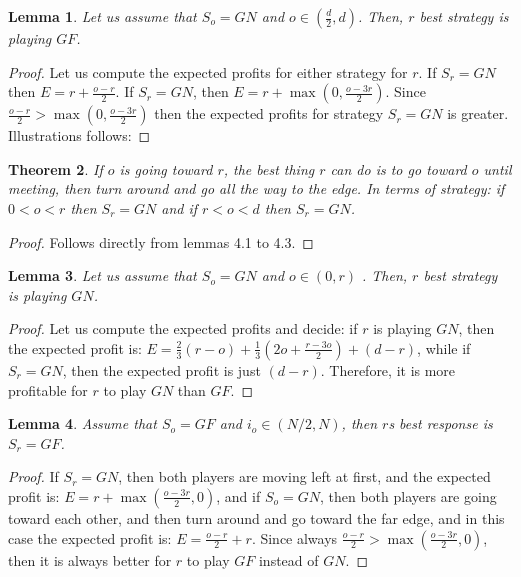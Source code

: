 \documentclass[a4paper,10pt]{article}
\newtheorem{theorem}{Theorem}[section]
\newtheorem{lemma}[theorem]{Lemma}
\newcommand\rob{\ensuremath{r}\xspace}
\newcommand\opp{\ensuremath{o}\xspace}
\newcommand{\gn}{\ensuremath{GN}\xspace}
\newcommand{\gf}{\ensuremath{GF}\xspace}
\begin{document}
\begin{lemma}
Let us assume that $S_{\opp}=\gn$ and $o\in\left(\frac{d}{2},d\right)$. Then, \rob best strategy is playing $\gf$.
\end{lemma}
\begin{proof}
Let us compute the expected profits for either strategy for \rob.
If $S_{\rob}=\gn$ then $E=r+\frac{o-r}{2}$. If $S_{\rob}=\gn$, then $E=r+\max\left(0,\frac{o-3r}{2}\right)$. Since $\frac{o-r}{2} > \max\left(0,\frac{o-3r}{2}\right)$ then the expected profits for strategy $S_{\rob}=\gn$ is greater. Illustrations follows:
\end{proof}

\begin{theorem}
If \opp is going toward \rob, the best thing \rob can do is to go toward \opp until meeting, then turn around and go all the way to the edge. In terms of strategy: if $0<o<r$ then $S_{\rob}=\gn$ and if $r<o<d$ then $S_{\rob}=\gn$.
\end{theorem}
\begin{proof}
Follows directly from lemmas 4.1 to 4.3.
\end{proof}

\begin{lemma}
Let us assume that $S_{\opp}=\gn$ and $o\in\left(0,r\right)$ . Then, \rob best strategy is playing \gn.
\end{lemma}
\begin{proof}
Let us compute the expected profits and decide:
if \rob is playing \gn, then the expected profit is: $E=\frac{2}{3}(r-o) +\frac{1}{3}(2o+\frac{r-3o}{2}) + (d-r)$, while if $S_{\rob}=\gn$, then the expected profit is just $(d-r)$. Therefore, it is more profitable for \rob to play \gn than $\gf$.
\end{proof}

\begin{lemma}
Assume that $ S_\opp=\gf$ and $i_\opp \in (N/2,N)$, then {\rob}s best response is $S_\rob=\gf$.
\end{lemma}
\begin{proof}
If $S_{\rob}=\gn$, then both players are moving left at first, and the expected profit is: $E=r+\max\left(\frac{o-3r}{2},0\right)$, and if $S_{\opp}=\gn$, then both players are going toward each other, and then turn around and go toward the far edge, and in this case the expected profit is: $E=\frac{o-r}{2}+r$. Since always $\frac{o-r}{2}>\max\left(\frac{o-3r}{2},0\right)$, then it is always better for \rob to play $\gf$ instead of \gn.
\end{proof}
\end{document}
